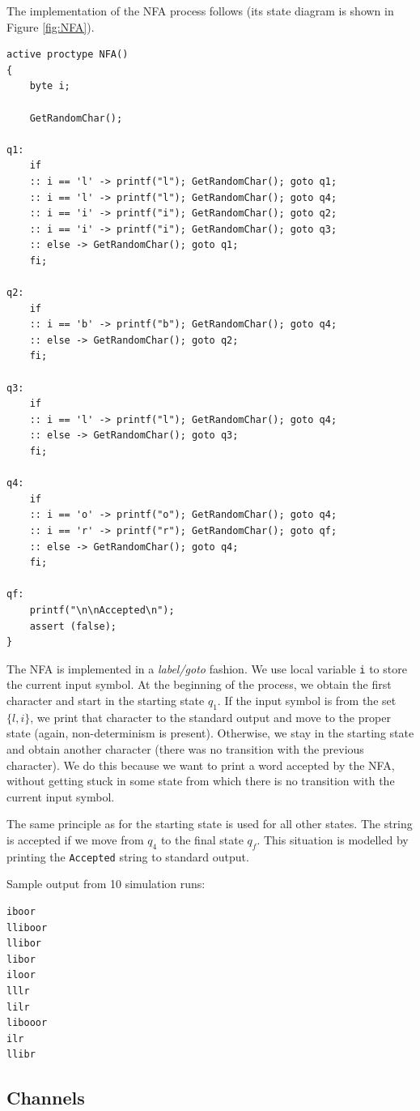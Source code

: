 The implementation of the NFA process follows (its state diagram is shown in Figure \ref{fig:NFA}).

\begin{lstlisting}[name=example1_listing]
active proctype NFA()
{
	byte i;

	GetRandomChar();

q1:
	if
	:: i == 'l' -> printf("l"); GetRandomChar(); goto q1;
	:: i == 'l' -> printf("l"); GetRandomChar(); goto q4;
	:: i == 'i' -> printf("i"); GetRandomChar(); goto q2;
	:: i == 'i' -> printf("i"); GetRandomChar(); goto q3;
	:: else -> GetRandomChar(); goto q1;
	fi;

q2:
	if
	:: i == 'b' -> printf("b"); GetRandomChar(); goto q4;
	:: else -> GetRandomChar(); goto q2;
	fi;

q3:
	if
	:: i == 'l' -> printf("l"); GetRandomChar(); goto q4;
	:: else -> GetRandomChar(); goto q3;
	fi;

q4:
	if
	:: i == 'o' -> printf("o"); GetRandomChar(); goto q4;
	:: i == 'r' -> printf("r"); GetRandomChar(); goto qf;
	:: else -> GetRandomChar(); goto q4;
	fi;

qf:
	printf("\n\nAccepted\n");
	assert (false);
}
\end{lstlisting}

The NFA is implemented in a \emph{label/goto} fashion. We use local variable \texttt{i} to store the current input symbol. At the beginning of the process, we obtain the first character and start in the starting state $q_{1}$. If the input symbol is from the set $\{l, i\}$, we print that character to the standard output and move to the proper state (again, non-determinism is present). Otherwise, we stay in the starting state and obtain another character (there was no transition with the previous character). We do this because we want to print a word accepted by the NFA, without getting stuck in some state from which there is no transition with the current input symbol.

The same principle as for the starting state is used for all other states. The string is accepted if we move from $q_{4}$ to the final state $q_{f}$. This situation is modelled by printing the \texttt{Accepted} string to standard output.

Sample output from 10 simulation runs:
\begin{verbatim}
iboor
lliboor
llibor
libor
iloor
lllr
lilr
libooor
ilr
llibr
\end{verbatim}

\subsection*{Channels}

